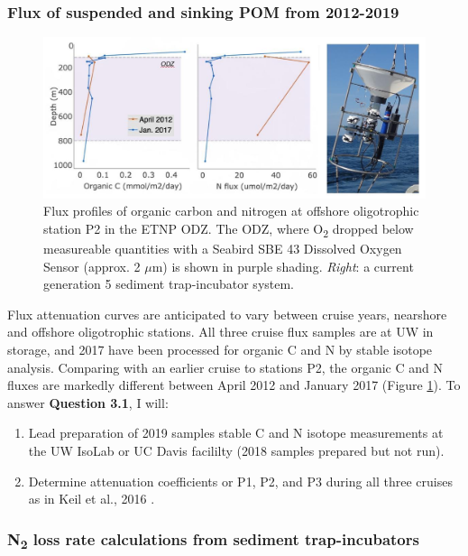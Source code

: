 \documentclass[12pt, letterpaper, twoside]{article}
\begin{document}
\bigskip

\subsubsection{Flux of suspended and sinking POM from 2012-2019}

\begin{figure}
	\includegraphics[width=\linewidth]{etnp-flux-trap.jpg}
	\caption{Flux profiles of organic carbon and nitrogen at offshore oligotrophic station P2 in the ETNP ODZ. The ODZ, where O\textsubscript{2} dropped below measureable quantities with a Seabird SBE 43 Dissolved Oxygen Sensor (approx. 2 $\mu$m) is shown in purple shading. \textit{Right}: a current generation 5 sediment trap-incubator system.}
	\label{fig:etnp flux}
\end{figure}

Flux attenuation curves are anticipated to vary between cruise years, nearshore and offshore oligotrophic stations. All three cruise flux samples are at UW in storage, and 2017 have been processed for organic C and N by stable isotope analysis. Comparing with an earlier cruise to stations P2, the organic C and N fluxes are markedly different between April 2012 and January 2017 (Figure \ref{fig:etnp flux}). To answer \textbf{Question 3.1}, I will:

\begin{enumerate}
	\item[1.] Lead preparation of 2019 samples stable C and N isotope measurements at the UW IsoLab or UC Davis facililty (2018 samples prepared but not run).
	\item[2.] Determine attenuation coefficients or P1, P2, and P3 during all three cruises as in Keil et al., 2016 \cite{keil_multiproxy_2016}.
\end{enumerate}

\subsubsection{N\textsubscript{2} loss rate calculations from sediment trap-incubators}
\end{document}
